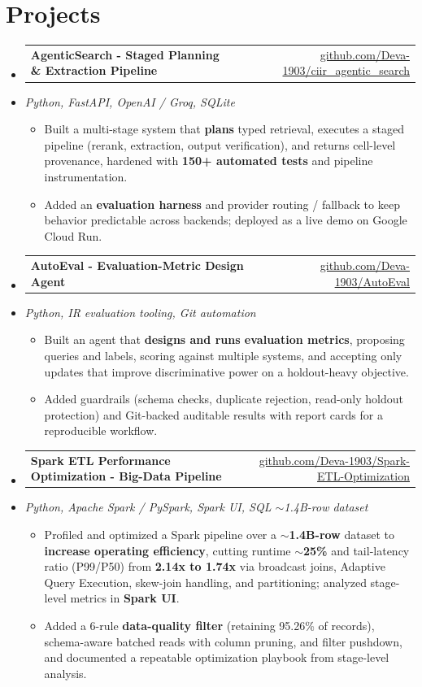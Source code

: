 \documentclass[letterpaper,10pt]{article}
\makeatletter
\newcommand{\resumeItem}[1]{
  \item\small{#1\vspace{-1pt}}
}
\newcommand{\resumeProjectHeading}[2]{
    \item
    \begin{tabular*}{0.985\textwidth}[t]{l@{\extracolsep{\fill}}r}
      \small\textbf{#1} & \small #2 \\
    \end{tabular*}\vspace{-5pt}
}
\newcommand{\resumeProjectSubheading}[1]{
  \vspace{-2pt}\item[] {\small\textcolor{ResumeSlate}{\emph{#1}}}\vspace{-3pt}
}
\newcommand{\resumeSubHeadingListStart}{\begin{itemize}[leftmargin=0.0in, label={}, itemsep=2pt, topsep=2pt]}
\newcommand{\resumeSubHeadingListEnd}{\end{itemize}}
\newcommand{\resumeItemListStart}{\begin{itemize}[leftmargin=0.18in, itemsep=2pt, topsep=1pt]}
\newcommand{\resumeItemListEnd}{\end{itemize}\vspace{-4pt}}
\makeatother
\begin{document}
\section{Projects}
\resumeSubHeadingListStart
  \resumeProjectHeading
    {AgenticSearch - Staged Planning \& Extraction Pipeline}
    {\href{https://github.com/Deva-1903/ciir_agentic_search}{github.com/Deva-1903/ciir\_agentic\_search}}
  \resumeProjectSubheading{Python, FastAPI, OpenAI / Groq, SQLite}
    \resumeItemListStart
      \resumeItem{Built a multi-stage system that \textbf{plans} typed retrieval, executes a staged pipeline (rerank, extraction, output verification), and returns cell-level provenance, hardened with \textbf{150+ automated tests} and pipeline instrumentation.}
      \resumeItem{Added an \textbf{evaluation harness} and provider routing / fallback to keep behavior predictable across backends; deployed as a live demo on Google Cloud Run.}
    \resumeItemListEnd
  \resumeProjectHeading
    {AutoEval - Evaluation-Metric Design Agent}
    {\href{https://github.com/Deva-1903/AutoEval}{github.com/Deva-1903/AutoEval}}
  \resumeProjectSubheading{Python, IR evaluation tooling, Git automation}
    \resumeItemListStart
      \resumeItem{Built an agent that \textbf{designs and runs evaluation metrics}, proposing queries and labels, scoring against multiple systems, and accepting only updates that improve discriminative power on a holdout-heavy objective.}
      \resumeItem{Added guardrails (schema checks, duplicate rejection, read-only holdout protection) and Git-backed auditable results with report cards for a reproducible workflow.}
    \resumeItemListEnd
  \resumeProjectHeading
    {Spark ETL Performance Optimization - Big-Data Pipeline}
    {\href{https://github.com/Deva-1903/Spark-ETL-Optimization}{github.com/Deva-1903/Spark-ETL-Optimization}}
  \resumeProjectSubheading{Python, Apache Spark / PySpark, Spark UI, SQL \enspace\textbar\enspace \(\sim\)1.4B-row dataset}
    \resumeItemListStart
      \resumeItem{Profiled and optimized a Spark pipeline over a \textbf{\(\sim\)1.4B-row} dataset to \textbf{increase operating efficiency}, cutting runtime \textbf{\(\sim\)25\%} and tail-latency ratio (P99/P50) from \textbf{2.14x to 1.74x} via broadcast joins, Adaptive Query Execution, skew-join handling, and partitioning; analyzed stage-level metrics in \textbf{Spark UI}.}
      \resumeItem{Added a 6-rule \textbf{data-quality filter} (retaining 95.26\% of records), schema-aware batched reads with column pruning, and filter pushdown, and documented a repeatable optimization playbook from stage-level analysis.}
    \resumeItemListEnd
\resumeSubHeadingListEnd
\vspace{-4pt}
\end{document}
